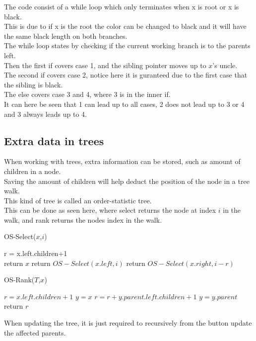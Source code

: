 \documentclass[12pt, a4paper]{article}
\begin{document}
				The code consist of a while loop which only terminates when x is root or x is black.\\
				This is due to if x is the root the color can be changed to black and it will have the same black length on both branches.\\
				The while loop states by checking if the current working branch is to the parents left.\\
				Then the first if covers case 1, and the sibling pointer moves up to $x$'s uncle.\\
				The second if covers case 2, notice here it is guranteed due to the first case that the sibling is black.\\
				The else covers case 3 and 4, where 3 is in the inner if. \\
				It can here be seen that 1 can lead up to all cases, 2 does not lead up to 3 or 4 and 3 always leads up to 4.
		\subsection{Extra data in trees}
			When working with trees, extra information can be stored, such as amount of children in a node.\\
			Saving the amount of children will help deduct the position of the node in a tree walk.\\
			This kind of tree is called an order-statistic tree.\\
			This can be done as seen here, where select returns the node at index $i$ in the walk, and rank returns the nodes index in the walk.\\[4mm]
			\begin{minipage}{0.49\textwidth}
				OS-Select($x$,$i$)
				\begin{algorithmic}[1]
					\State r = x.left.children+1\\
						\State return $x$
						\State return $OS-Select(x.left,i)$
					\Else
						\State return $OS-Select(x.right,i-r)$

					\EndIf
				\end{algorithmic}
			\end{minipage}
			\begin{minipage}{0.49\textwidth}
				OS-Rank($T$,$x$)
				\begin{algorithmic}[1]
					\State $r = x.left.children+1$
					\State $y = x$
							\State $r = r + y.parent.left.children+1$
						\EndIf
						\State $y = y.parent$
					\EndWhile
					\State return $r$
				\end{algorithmic}
			\end{minipage}
			When updating the tree, it is just required to recursively from the button update the affected parents.
					
\end{document}
